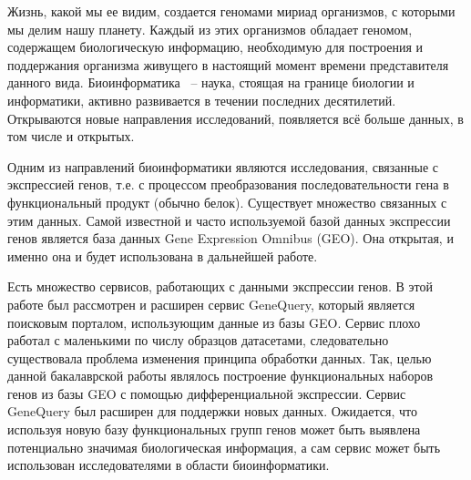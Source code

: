 \documentclass[times,specification,annotation]{itmo-student-thesis}
\begin{document}





\tableofcontents

\startprefacepage

Жизнь, какой мы ее видим, создается геномами мириад организмов, с которыми мы делим нашу планету. Каждый из этих организмов обладает геномом, содержащем биологическую информацию, необходимую для построения и поддержания организма живущего в настоящий момент времени представителя данного вида.\cite{Introduction} Биоинформатика ~-- наука, стоящая на границе биологии и информатики, активно развивается в течении последних десятилетий. Открываются новые направления исследований, появляется всё больше данных, в том числе и открытых.

Одним из направлений биоинформатики являются исследования, связанные с экспрессией генов, т.е. с процессом преобразования последовательности гена в функциональный продукт (обычно белок). Существует множество связанных с этим данных. Самой известной и часто используемой базой данных экспрессии генов является база данных ​Gene Expression Omnibus (GEO). Она открытая, и именно она и будет использована в дальнейшей работе. 

Есть множество сервисов, работающих с данными экспрессии генов. В этой работе был рассмотрен и расширен сервис GeneQuery, который является поисковым порталом, использующим данные из базы GEO. Сервис плохо работал с маленькими по числу образцов датасетами, следовательно существовала проблема изменения принципа обработки данных. Так, целью данной бакалаврской работы являлось построение функциональных наборов генов из базы GEO с помощью дифференциальной экспрессии. Сервис GeneQuery был расширен для поддержки новых данных. Ожидается, что используя новую базу функциональных групп генов может быть выявлена потенциально значимая биологическая информация, а сам сервис может быть использован исследователями в области биоинформатики.        
\end{document}
